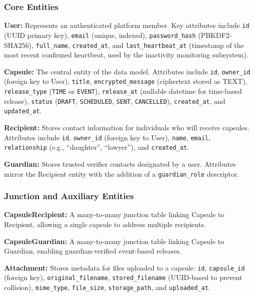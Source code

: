 \documentclass[12pt, a4paper]{article}
\begin{document}
\subsubsection{Core Entities}

\textbf{User:} Represents an authenticated platform member. Key attributes include \texttt{id} (UUID primary key), \texttt{email} (unique, indexed), \texttt{password\_hash} (PBKDF2-SHA256), \texttt{full\_name}, \texttt{created\_at}, and \texttt{last\_heartbeat\_at} (timestamp of the most recent confirmed heartbeat, used by the inactivity monitoring subsystem).

\textbf{Capsule:} The central entity of the data model. Attributes include \texttt{id}, \texttt{owner\_id} (foreign key to User), \texttt{title}, \texttt{encrypted\_message} (ciphertext stored as TEXT), \texttt{release\_type} (\texttt{TIME} or \texttt{EVENT}), \texttt{release\_at} (nullable datetime for time-based release), \texttt{status} (\texttt{DRAFT}, \texttt{SCHEDULED}, \texttt{SENT}, \texttt{CANCELLED}), \texttt{created\_at}, and \texttt{updated\_at}.

\textbf{Recipient:} Stores contact information for individuals who will receive capsules. Attributes include \texttt{id}, \texttt{owner\_id} (foreign key to User), \texttt{name}, \texttt{email}, \texttt{relationship} (e.g., ``daughter'', ``lawyer''), and \texttt{created\_at}.

\textbf{Guardian:} Stores trusted verifier contacts designated by a user. Attributes mirror the Recipient entity with the addition of a \texttt{guardian\_role} descriptor.

\subsubsection{Junction and Auxiliary Entities}

\textbf{CapsuleRecipient:} A many-to-many junction table linking Capsule to Recipient, allowing a single capsule to address multiple recipients.

\textbf{CapsuleGuardian:} A many-to-many junction table linking Capsule to Guardian, enabling guardian-verified event-based releases.

\textbf{Attachment:} Stores metadata for files uploaded to a capsule: \texttt{id}, \texttt{capsule\_id} (foreign key), \texttt{original\_filename}, \texttt{stored\_filename} (UUID-based to prevent collision), \texttt{mime\_type}, \texttt{file\_size}, \texttt{storage\_path}, and \texttt{uploaded\_at}.
\end{document}

